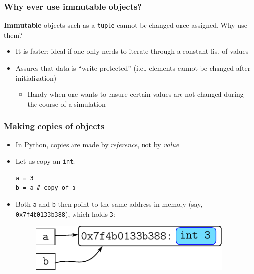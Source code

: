 \documentclass[xcolor=table]{beamer}
\begin{document}
\begin{frame}[fragile]
\frametitle{Why ever use immutable objects?}

    \textbf{Immutable} objects such as a \texttt{tuple} cannot be changed once assigned. Why use them?
    \pause
\begin{itemize}
    \item It is faster: ideal if one only needs to iterate through a constant list of values
        \pause
    \item Assures that data is ``write-protected'' (i.e., elements cannot be changed after initialization)
        \begin{itemize}
            \item Handy when one wants to ensure certain values are not changed during the course of a simulation
        \end{itemize}
\end{itemize}

\end{frame}
\begin{frame}[fragile]
\frametitle{Making copies of objects}
    \begin{itemize} 
        \item In Python, copies are made by \emph{reference}, not by \emph{value} 
            \pause 
        \item Let us copy an \texttt{int}:
\begin{lstlisting}[style=python,belowskip=-0.8\baselineskip]
a = 3
b = a # copy of a
\end{lstlisting} \pause
        \item Both \texttt{a} and \texttt{b} then point to the same address in memory (say, \texttt{0x7f4b0133b388}), which holds \texttt{3}: 
            \begin{figure}\centering%
                \vspace{1ex}%
                \includegraphics[width = 100mm]{variable_assignment1.pdf}
            \end{figure}
    \end{itemize} 

\end{frame}
\end{document}
